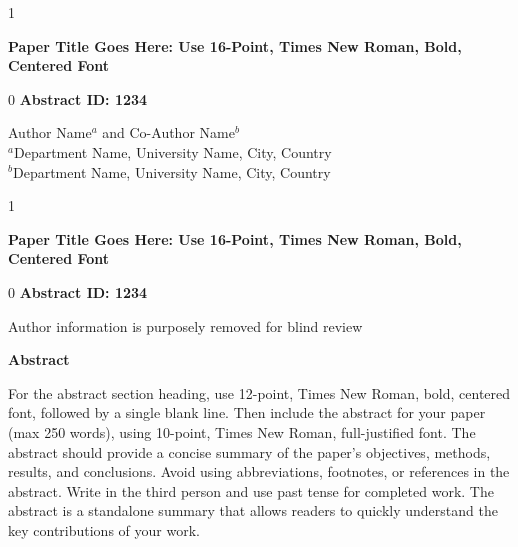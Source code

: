 \documentclass[10pt]{article}
\def\blind{1}
\def\final{0}
\begin{document}
\thispagestyle{firstpage}


\blind
\begin{center}
{\fontsize{16}{19}\bfseries\selectfont
Paper Title Goes Here: Use 16-Point, Times New Roman, Bold, Centered Font}

\vspace{10pt}

\final
{\fontsize{12}{14}\bfseries\selectfont Abstract ID: 1234}

\vspace{10pt}
\fi

{\fontsize{10}{12}\selectfont
Author Name$^{a}$ and Co-Author Name$^{b}$ \\
\vspace{5pt}
$^{a}$Department Name, University Name, City, Country \\
$^{b}$Department Name, University Name, City, Country}
\end{center}
\fi

\blind
\begin{center}
{\fontsize{16}{19}\bfseries\selectfont
Paper Title Goes Here: Use 16-Point, Times New Roman, Bold, Centered Font}

\vspace{10pt}

\final
{\fontsize{12}{14}\bfseries\selectfont Abstract ID: 1234}

\vspace{10pt}
\fi

{\fontsize{10}{12}\selectfont Author information is purposely removed for blind review}
\end{center}
\fi

\vspace{10pt}

\begin{center}
{\fontsize{12}{14}\bfseries\selectfont Abstract}
\end{center}

{\fontsize{10}{12}\selectfont
For the abstract section heading, use 12-point, Times New Roman, bold, centered font, followed by a single blank line. Then include the abstract for your paper (max 250 words), using 10-point, Times New Roman, full-justified font. The abstract should provide a concise summary of the paper's objectives, methods, results, and conclusions. Avoid using abbreviations, footnotes, or references in the abstract. Write in the third person and use past tense for completed work. The abstract is a standalone summary that allows readers to quickly understand the key contributions of your work.
}
\end{document}
